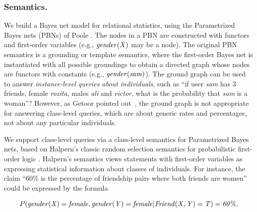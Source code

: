\documentclass[oribibl]{llncs}
\begin{document}
\subsubsection{Semantics.} 
We build a Bayes net model for relational statistics, using 
the Parametrized Bayes nets (PBNs) of Poole \cite{Poole2003}. The nodes in a PBN are constructed with functors and first-order variables (e.g., $\it{gender}(X)$ may be a node). The original PBN semantics is a grounding or template semantics, where the first-order Bayes net is instantiated with all possible groundings to obtain a directed graph whose nodes are functors with constants (e.g., $\it{gender}(sam)$). The ground graph can be used to answer {\em instance-level queries about individuals}, such as ``if user \emph{sam} has 3 friends, female \emph{rozita}, males \emph{ali} and \emph{victor}, what is the probability that \emph{sam} is a woman''? However, as Getoor pointed out~\cite{Getoor2001a}, the ground graph is not appropriate for answering class-level queries, %
which are about generic rates and percentages, not about any particular individuals. 

We support class-level queries via a class-level semantics for Parametrized Bayes nets, based on Halpern's classic random selection semantics for probabilistic first-order logic \cite{Halpern90,Bacchus90}. Halpern's semantics views statements with first-order variables as expressing statistical information about classes  of individuals. For instance, the claim ``60\% is the percentage of friendship pairs where both  friends are women''
could be expressed by the formula 

\[
P(\it{gender}(X) = \it{female}, \it{gender}(Y) = \it{female}|\it{Friend}(X,Y) = \mathit{T}) = 60\%.
\]

%


\end{document}
